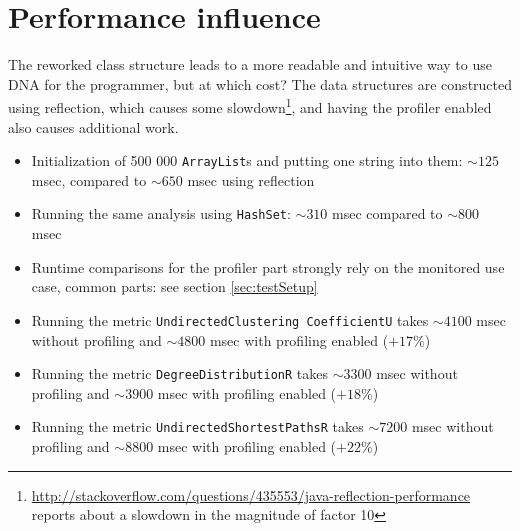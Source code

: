 \section{Performance influence}
	The reworked class structure leads to a more readable and intuitive way to use DNA for
	the programmer, but at which cost? The data structures are constructed using reflection,
	which causes some
	slowdown\footnote{\url{http://stackoverflow.com/questions/435553/java-reflection-performance}
	reports about a slowdown in the magnitude of factor 10}, and having the profiler
	enabled also causes additional work.
	
	\begin{itemize}
		\item Initialization of 500 000 \texttt{ArrayList}s and putting one string into them:
			$\sim 125$ msec, compared to $\sim 650$ msec using reflection
		\item Running the same analysis using \texttt{HashSet}: $\sim 310$ msec compared to
			$\sim 800$ msec
		\item Runtime comparisons for the profiler part strongly rely on the monitored use case,
			common parts: see section \ref{sec:testSetup}
		\item Running the metric \texttt{Undirected\allowbreak Clustering\allowbreak
			CoefficientU} takes $\sim 4100$ msec without profiling and $\sim 4800$ msec with
			profiling enabled ($+ 17\%$)
		\item Running the metric \texttt{Degree\allowbreak DistributionR} takes $\sim 3300$
			msec without profiling and $\sim 3900$ msec with profiling enabled ($+ 18\%$)
		\item Running the metric \texttt{Undirected\allowbreak Shortest\allowbreak PathsR} takes
		$\sim 7200$ msec without profiling and $\sim 8800$ msec with profiling enabled ($+ 22\%$)
	\end{itemize}